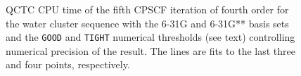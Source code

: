 \documentclass[prl,twocolumn,showpacs,twocolumngrid,superbib]{revtex4}
\begin{document}
{\begin{figure}[h]
  \caption{\protect
    QCTC CPU time of the fifth CPSCF iteration of fourth order for
    the water cluster sequence with the 6-31G and 6-31G** 
    basis sets and the {\tt GOOD} and {\tt TIGHT} 
    numerical thresholds (see text) controlling numerical
    precision of the result. The lines are fits to the 
    last three and four points, respectively.
  }\label{fig:Gamma_QCTC_Timing}
\end{figure}

}
\end{document}
